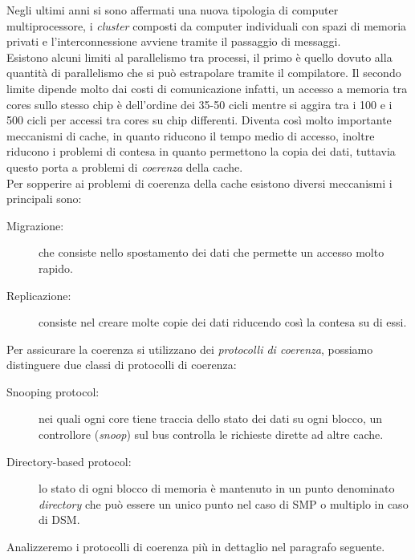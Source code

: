 Negli ultimi anni si sono affermati una nuova tipologia di computer multiprocessore, i \emph{cluster} composti da computer individuali con spazi di memoria privati e l'interconnessione avviene tramite il passaggio di messaggi.\\
Esistono alcuni limiti al parallelismo tra processi, il primo è quello dovuto alla quantità di parallelismo che si può estrapolare tramite il compilatore. Il secondo limite dipende molto dai costi di comunicazione infatti, un accesso a memoria tra cores sullo stesso chip è dell'ordine dei 35-50 cicli mentre si aggira tra i 100 e i 500 cicli per accessi tra cores su chip differenti. Diventa così molto importante meccanismi di cache, in quanto riducono il tempo medio di accesso, inoltre riducono i problemi di contesa in quanto permettono la copia dei dati, tuttavia questo porta a problemi di \emph{coerenza} della cache.\\
Per sopperire ai problemi di coerenza della cache esistono diversi meccanismi i principali sono:
\begin{description}
\item[Migrazione:] che consiste nello spostamento dei dati che permette un accesso molto rapido.
\item[Replicazione:] consiste nel creare molte copie dei dati riducendo così la contesa su di essi.
\end{description}
Per assicurare la coerenza si utilizzano dei \emph{protocolli di coerenza}, possiamo distinguere due classi di protocolli di coerenza:
\begin{description}
\item[Snooping protocol:] nei quali ogni core tiene traccia dello stato dei dati su ogni blocco, un controllore (\emph{snoop}) sul bus controlla le richieste dirette ad altre cache.
\item[Directory-based protocol:] lo stato di ogni blocco di memoria è mantenuto in un punto denominato \emph{directory} che può essere un unico punto nel caso di SMP o multiplo in caso di DSM.
\end{description}
Analizzeremo i protocolli di coerenza più in dettaglio nel paragrafo seguente.\\
